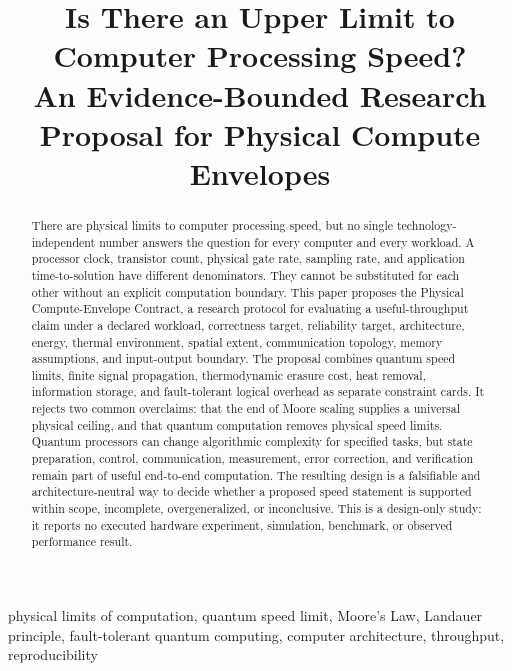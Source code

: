 \documentclass[conference]{IEEEtran}
\begin{document}
\title{Is There an Upper Limit to Computer Processing Speed?\\
An Evidence-Bounded Research Proposal for Physical Compute Envelopes}

\author{
}

\maketitle

\begin{abstract}
There are physical limits to computer processing speed, but no single
technology-independent number answers the question for every computer and
every workload. A processor clock, transistor count, physical gate rate,
sampling rate, and application time-to-solution have different denominators.
They cannot be substituted for each other without an explicit computation
boundary. This paper proposes the Physical Compute-Envelope Contract, a
research protocol for evaluating a useful-throughput claim under a declared
workload, correctness target, reliability target, architecture, energy,
thermal environment, spatial extent, communication topology, memory
assumptions, and input-output boundary. The proposal combines quantum speed
limits, finite signal propagation, thermodynamic erasure cost, heat removal,
information storage, and fault-tolerant logical overhead as separate
constraint cards. It rejects two common overclaims: that the end of Moore
scaling supplies a universal physical ceiling, and that quantum computation
removes physical speed limits. Quantum processors can change algorithmic
complexity for specified tasks, but state preparation, control, communication,
measurement, error correction, and verification remain part of useful
end-to-end computation. The resulting design is a falsifiable and
architecture-neutral way to decide whether a proposed speed statement is
supported within scope, incomplete, overgeneralized, or inconclusive. This is
a design-only study: it reports no executed hardware experiment, simulation,
benchmark, or observed performance result.
\end{abstract}

\begin{IEEEkeywords}
physical limits of computation, quantum speed limit, Moore's Law, Landauer
principle, fault-tolerant quantum computing, computer architecture,
throughput, reproducibility
\end{IEEEkeywords}
\end{document}
